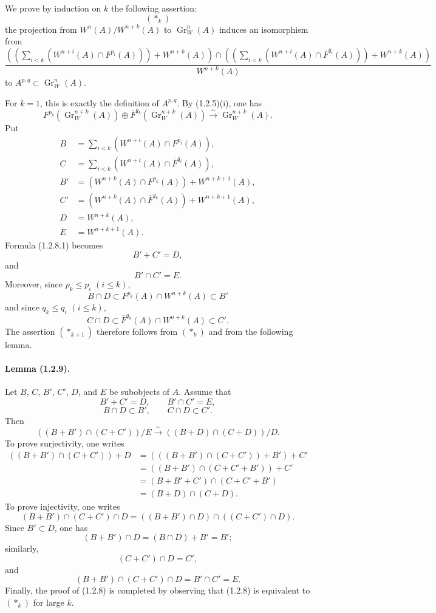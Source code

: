 \documentclass[10pt]{article}
\newcommand{\Gr}{\operatorname{Gr}}
\newcommand{\iso}{\xrightarrow{\sim}}
\begin{document}
We prove by induction on $k$ the following assertion:
\[
(*_k)
\]
the projection from $W^n(A)/W^{n+k}(A)$ to $\Gr_W^n(A)$ induces an isomorphism from
\[
\frac{\left(\left(\sum_{i<k}(W^{n+i}(A)\cap F^{p_i}(A))\right)+W^{n+k}(A)\right)
\cap
\left(\left(\sum_{i<k}(W^{n+i}(A)\cap\overline F^{q_i}(A))\right)+W^{n+k}(A)\right)}{W^{n+k}(A)}
\]
to $A^{p,q}\subset\Gr_W^n(A)$.

For $k=1$, this is exactly the definition of $A^{p,q}$. By (1.2.5)(i), one has
\[
\tag{1.2.8.1}
F^{p_k}(\Gr_W^{n+k}(A))\oplus \overline F^{q_k}(\Gr_W^{n+k}(A))\iso \Gr_W^{n+k}(A).
\]
Put
\begin{align*}
B&=\sum_{i<k}(W^{n+i}(A)\cap F^{p_i}(A)),\\
C&=\sum_{i<k}(W^{n+i}(A)\cap\overline F^{q_i}(A)),\\
B'&=(W^{n+k}(A)\cap F^{p_k}(A))+W^{n+k+1}(A),\\
C'&=(W^{n+k}(A)\cap\overline F^{q_k}(A))+W^{n+k+1}(A),\\
D&=W^{n+k}(A),\\
E&=W^{n+k+1}(A).
\end{align*}
Formula (1.2.8.1) becomes
\[
B'+C'=D,
\]
and
\[
B'\cap C'=E.
\]
Moreover, since $p_k\le p_i$ $(i\le k)$,
\[
B\cap D\subset F^{p_k}(A)\cap W^{n+k}(A)\subset B'
\]
and since $q_k\le q_i$ $(i\le k)$,
\[
C\cap D\subset \overline F^{q_k}(A)\cap W^{n+k}(A)\subset C'.
\]
The assertion $(*_{k+1})$ therefore follows from $(*_k)$ and from the following lemma.

\paragraph{Lemma (1.2.9).} Let $B$, $C$, $B'$, $C'$, $D$, and $E$ be subobjects of $A$. Assume that
\[
B'+C'=D,
\qquad
B'\cap C'=E,
\]
\[
B\cap D\subset B',
\qquad
C\cap D\subset C'.
\]
Then
\[
((B+B')\cap(C+C'))/E\iso((B+D)\cap(C+D))/D.
\]
To prove surjectivity, one writes
\begin{align*}
((B+B')\cap(C+C'))+D
&=(((B+B')\cap(C+C'))+B')+C'\\
&=((B+B')\cap(C+C'+B'))+C'\\
&=(B+B'+C')\cap(C+C'+B')\\
&=(B+D)\cap(C+D).
\end{align*}
To prove injectivity, one writes
\[
(B+B')\cap(C+C')\cap D=((B+B')\cap D)\cap((C+C')\cap D).
\]
Since $B'\subset D$, one has
\[
(B+B')\cap D=(B\cap D)+B'=B';
\]
similarly,
\[
(C+C')\cap D=C',
\]
and
\[
(B+B')\cap(C+C')\cap D=B'\cap C'=E.
\]
Finally, the proof of (1.2.8) is completed by observing that (1.2.8) is equivalent to $(*_k)$ for large $k$.
\end{document}
